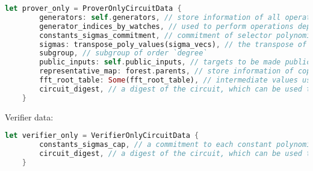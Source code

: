\begin{lstlisting}[language=rust]
    let prover_only = ProverOnlyCircuitData {
        generators: self.generators, // store information of all operations and used to generate full witness
        generator_indices_by_watches, // used to perform operations dependent on other operations
        constants_sigmas_commitment, // commitment of selector polynomials, constant polynomials and sigma polynomials
        sigmas: transpose_poly_values(sigma_vecs), // the transpose of the list of sigma polynomials
        subgroup, // subgroup of order `degree`
        public_inputs: self.public_inputs, // targets to be made public
        representative_map: forest.parents, // store information of copy constrains
        fft_root_table: Some(fft_root_table), // intermediate values used in fft
        circuit_digest, // a digest of the circuit, which can be used to seed Fiat-Shamir
    }
\end{lstlisting}

Verifier data:

\begin{lstlisting}[language=rust]
    let verifier_only = VerifierOnlyCircuitData {
        constants_sigmas_cap, // a commitment to each constant polynomial and each permutation polynomial
        circuit_digest, // a digest of the circuit, which can be used to seed Fiat-Shamir
    }
\end{lstlisting}
